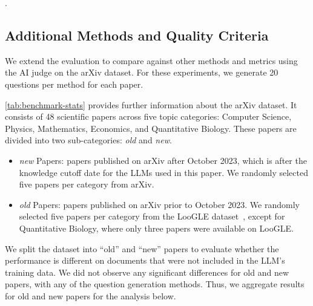 .
\clearpage


\subsection{Additional Methods and Quality Criteria}
\label{subsec:ablation}


We extend the evaluation to compare \name against other methods and metrics using the AI judge on the arXiv dataset. For these experiments, we generate 20 questions per method for each paper. 

\autoref{tab:benchmark-stats} provides further information  about the arXiv dataset. It consists of 48 scientific papers across five topic categories: Computer Science, Physics, Mathematics, Economics, and Quantitative Biology. These papers are divided into two sub-categories: \emph{old} and \emph{new}.

\begin{itemize}[topsep=0pt, itemsep=0pt, leftmargin=*]
    \item \emph{new} Papers: papers published on arXiv after October 2023, which is after the knowledge cutoff date for the LLMs used in this paper. We randomly selected five papers per category from arXiv.
    \item \emph{old} Papers: papers published on arXiv prior to October 2023. We randomly selected five papers per category from the LooGLE dataset~\cite{loogle}, except for Quantitative Biology, where only three papers were available on LooGLE.
\end{itemize}

We split the dataset into ``old'' and ``new'' papers to evaluate whether the performance is different on documents that were not included in the LLM's training data. We did not observe any significant differences for old and new papers, with any of the question generation methods. Thus, we aggregate results for old and new papers for the analysis below.  




